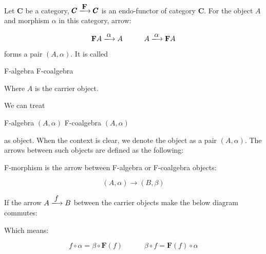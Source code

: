 \documentclass{article}
\begin{document}
\begin{definition}
\normalfont
Let $\pmb{C}$ be a category, $\pmb{C} \arrowto{\mathbf{F}} \pmb{C}$ is an endo-functor of category $\pmb{C}$. For the object $A$ and morphism $\alpha$ in this category, arrow:

\[
  \mathbf{F} A \arrowto{\alpha} A
  \quad \quad \quad
  A \arrowto{\alpha} \mathbf{F} A
\]

forms a pair $(A, \alpha)$. It is called

\begin{center}
  F-algebra \quad \quad \quad F-coalgebra
\end{center}

Where $A$ is the carrier object.
\end{definition}

We can treat

\begin{center}
  F-algebra $(A, \alpha)$ \quad \quad \quad F-coalgebra $(A, \alpha)$
\end{center}

as object. When the context is clear, we denote the object as a pair $(A, \alpha)$. The arrows between such objects are defined as the following:

\begin{definition}
\normalfont
F-morphism is the arrow between F-algebra or F-coalgebra objects:

\[
  (A, \alpha) \longrightarrow (B, \beta)
\]

If the arrow $A \arrowto{f} B$ between the carrier objects make the below diagram commutes:

\begin{center}
\end{center}

Which means:

\[
  f \circ \alpha = \beta \circ \mathbf{F}(f)
  \quad \quad \quad
  \beta \circ f = \mathbf{F}(f) \circ \alpha
\]
\end{definition}
\end{document}

